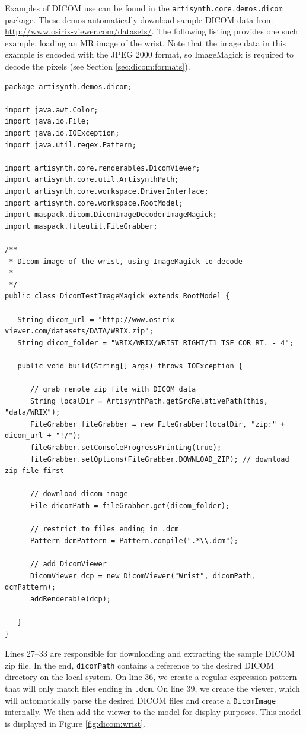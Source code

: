 Examples of DICOM use can be found in the \texttt{artisynth.core.demos.dicom} package.
These demos automatically download sample DICOM data from \url{http://www.osirix-viewer.com/datasets/}.
The following listing provides one such example, loading an MR image of the wrist.  Note that
the image data in this example is encoded with the JPEG 2000 format, so ImageMagick is required
to decode the pixels (see Section \ref{sec:dicom:formats}).
\lstset{numbers=left}
\begin{lstlisting}[]
package artisynth.demos.dicom;

import java.awt.Color;
import java.io.File;
import java.io.IOException;
import java.util.regex.Pattern;

import artisynth.core.renderables.DicomViewer;
import artisynth.core.util.ArtisynthPath;
import artisynth.core.workspace.DriverInterface;
import artisynth.core.workspace.RootModel;
import maspack.dicom.DicomImageDecoderImageMagick;
import maspack.fileutil.FileGrabber;

/**
 * Dicom image of the wrist, using ImageMagick to decode
 *
 */
public class DicomTestImageMagick extends RootModel {

   String dicom_url = "http://www.osirix-viewer.com/datasets/DATA/WRIX.zip";
   String dicom_folder = "WRIX/WRIX/WRIST RIGHT/T1 TSE COR RT. - 4";
   
   public void build(String[] args) throws IOException {
      
      // grab remote zip file with DICOM data
      String localDir = ArtisynthPath.getSrcRelativePath(this, "data/WRIX");
      FileGrabber fileGrabber = new FileGrabber(localDir, "zip:" + dicom_url + "!/");
      fileGrabber.setConsoleProgressPrinting(true);
      fileGrabber.setOptions(FileGrabber.DOWNLOAD_ZIP); // download zip file first

      // download dicom image
      File dicomPath = fileGrabber.get(dicom_folder);
      
      // restrict to files ending in .dcm
      Pattern dcmPattern = Pattern.compile(".*\\.dcm");
      
      // add DicomViewer
      DicomViewer dcp = new DicomViewer("Wrist", dicomPath, dcmPattern);
      addRenderable(dcp);
      
   }
} 
\end{lstlisting}
\lstset{numbers=none}
Lines 27--33 are responsible for downloading and extracting the sample DICOM
zip file.  In the end, \lstinline{dicomPath} contains a reference to the 
desired DICOM directory on the local system.  On line 36, we create
a regular expression pattern that will only match files ending in \texttt{.dcm}.
On line 39, we create the viewer, which will automatically parse the 
desired DICOM files and create a \lstinline{DicomImage} internally.  
We then add the viewer to the model for display purposes.  This model is
displayed in Figure \ref{fig:dicom:wrist}.

